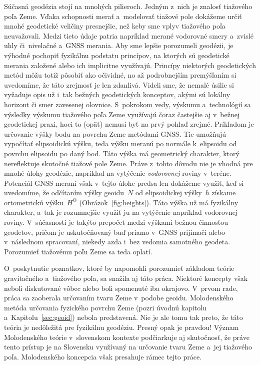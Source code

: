 \documentclass[a4paper, 12pt]{book}
\begin{document}
Súčasná geodézia stojí na mnohých pilieroch.  Jedným z~nich je znalosť 
tiažového poľa Zeme.  Vďaka schopnosti merať a~modelovať tiažové pole dokážeme 
určiť mnohé geodetické veličiny presnejšie, než keby sme vplyv tiažového poľa 
neuvažovali.  Medzi tieto údaje patria napríklad merané vodorovné smery 
a~zvislé uhly či~nivelačné a~GNSS merania.  Aby sme lepšie porozumeli geodézii, 
je výhodné pochopiť fyzikálnu podstatu princípov, na ktorých sú geodetické 
merania založené alebo ich implicitne využívajú.  Princípy niektorých 
geodetických metód môžu totiž pôsobiť ako očividné, no až podrobnejším 
premýšľaním si uvedomíme, že táto zrejmosť je len zdanlivá.  Videli sme, že 
nemalé úsilie si vyžaduje opis už i~tak bežných geodetických konceptov, akými 
sú lokálny horizont či smer zavesenej olovnice.  S~pokrokom vedy, výskumu 
a~technológií sa výsledky výskumu tiažového poľa Zeme využívajú čoraz častejšie 
aj v~bežnej geodetickej praxi, hoci to (opäť) nemusí byť na prvý pohlaď zrejmé.  
Príkladom je určovanie výšky bodu na povrchu Zeme metódami GNSS.  Tie umožňujú 
vypočítať elipsoidickú výšku, teda výšku meranú po normále k~elipsoidu od 
povrchu elipsoidu po daný bod.  Táto výška má geometrický charakter, ktorý 
nereflektuje skutočné tiažové pole Zeme.  Práve z~tohto dôvodu nie je vhodná 
pre mnohé úlohy geodézie, napríklad na vytýčenie \emph{vodorovnej} roviny 
v~teréne.  Potenciál GNSS meraní však v~tejto úlohe predsa len dokážeme využiť, 
keď si uvedomíme, že odčítaním výšky geoidu~$N$ od elipsoidickej výšky~$h$ 
získame ortometrickú výšku~$H^\mathrm{O}$ (Obrázok~\ref{fig:heights}).  Táto 
výška už má fyzikálny charakter, a~tak je rozumnejšie využiť ju na vytýčenie 
napríklad vodorovnej roviny.  V~súčasnosti je takýto prepočet medzi výškami 
bežnou činnosťou geodetov, pričom je uskutočňovaný buď priamo v~GNSS prijímači 
alebo v~následnom spracovaní, niekedy azda i~bez vedomia samotného geodeta.  
Porozumieť tiažovému poľu Zeme sa teda oplatí.

O~poskytnutie poznatkov, ktoré by napomohli porozumieť základom teórie 
gravitačného a~tiažového poľa, sa snažila aj táto práca.  Niektoré koncepty 
však neboli diskutované vôbec alebo boli spomenuté iba okrajovo.  V~prvom rade, 
práca sa zaoberala určovaním tvaru Zeme v~podobe geoidu.  Molodenského metóda 
určovania fyzického povrchu Zeme (pozri úvodnú kapitolu 
a~Kapitolu~\ref{sec:geoid}) nebola predstavená.  Nie je ale tomu tak preto, že 
táto teória je nedôležitá pre fyzikálnu geodéziu.  Presný opak je pravdou!  
Význam Molodenského teórie v~slovenskom kontexte podčiarkuje aj skutočnosť, že 
práve tento prístup je na Slovensku využívaný na určovanie tvaru Zeme a~jej 
tiažového poľa.  Molodenského koncepcia však presahuje rámec tejto práce.
\end{document}
